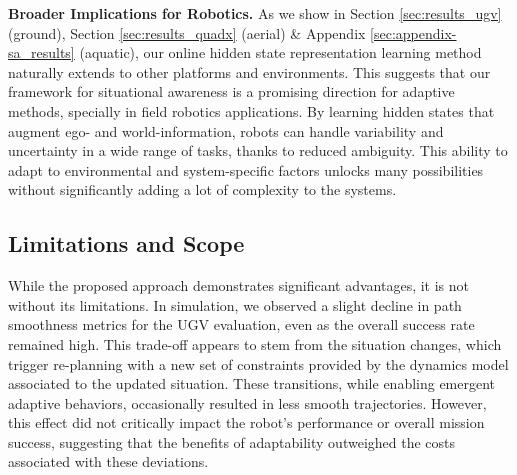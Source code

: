 \documentclass[Afour,sageh,times]{sagej}
\theoremstyle{lemma}
\begin{document}
\textbf{Broader Implications for Robotics.}
As we show in Section \ref{sec:results_ugv} (ground), Section \ref{sec:results_quadx} (aerial) \& Appendix \ref{sec:appendix-sa_results} (aquatic), our online hidden state representation learning method naturally extends to other platforms and environments. This suggests that our framework for situational awareness is a promising direction for adaptive methods, specially in field robotics applications. 
By learning hidden states that augment ego- and world-information, robots can handle variability and uncertainty in a wide range of tasks, thanks to reduced ambiguity. This ability to adapt to environmental and system-specific factors unlocks many possibilities without significantly adding a lot of complexity to the systems.

\subsection{Limitations and Scope} \label{sec:limitations}
While the proposed approach demonstrates significant advantages, it is not without its limitations. In simulation, we observed a slight decline in path smoothness metrics for the UGV evaluation, even as the overall success rate remained high. This trade-off appears to stem from the situation changes, which trigger re-planning with a new set of constraints provided by the dynamics model associated to the updated situation. These transitions, while enabling emergent adaptive behaviors, occasionally resulted in less smooth trajectories. However, this effect did not critically impact the robot's performance or overall mission success, suggesting that the benefits of adaptability outweighed the costs associated with these deviations.
\end{document}
